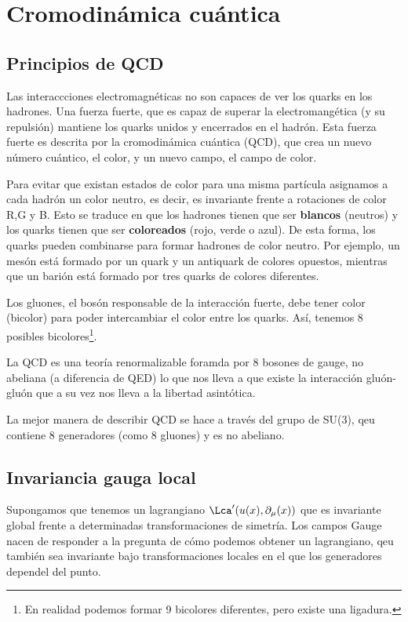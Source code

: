\chapter{Cromodinámica cuántica}

\section{Principios de QCD}

Las interaccciones electromagnéticas no son capaces de ver los quarks en los hadrones. Una fuerza fuerte, que es capaz de superar la electromangética (y su repulsión) mantiene los quarks unidos y encerrados en el hadrón. Esta fuerza fuerte es descrita por la cromodinámica cuántica (QCD), que crea un nuevo número cuántico, el color, y un nuevo campo, el campo de color.

Para evitar que existan estados de color para una misma partícula asignamos a cada hadrón un color neutro, es decir, es invariante frente a rotaciones de color R,G y B. Esto se traduce en que los hadrones tienen que ser \textbf{blancos} (neutros) y los quarks tienen que ser \textbf{coloreados} (rojo, verde o azul). De esta forma, los quarks pueden combinarse para formar hadrones de color neutro. Por ejemplo, un mesón está formado por un quark y un antiquark de colores opuestos, mientras que un barión está formado por tres quarks de colores diferentes.

Los gluones, el bosón responsable de la interacción fuerte, debe tener color (bicolor) para poder intercambiar el color entre los quarks. Así, tenemos 8 posibles bicolores\footnote{En realidad podemos formar 9 bicolores diferentes, pero existe una ligadura.}.

La QCD es una teoría renormalizable foramda por 8 bosones de gauge, no abeliana (a diferencia de QED) lo que nos lleva a que existe la interacción gluón-gluón que a su vez nos lleva a la libertad asintótica. 


La mejor manera de describir QCD se hace a través del grupo de SU(3), qeu contiene 8 generadores (como 8 gluones) y es no abeliano. 

\section{Invariancia gauga local}

Supongamos que tenemos un lagrangiano $\Lca'(u(x),\partial_\mu (x))$ que es invariante global frente a determinadas transformaciones de simetría. Los campos Gauge nacen de responder a la pregunta de cómo podemos obtener un lagrangiano, qeu también sea invariante bajo transformaciones locales en el que los generadores dependel del punto. 

